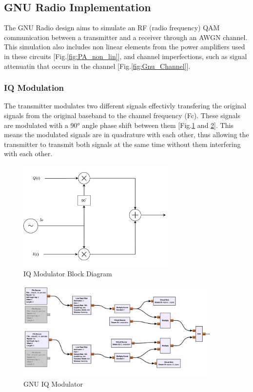 \subsection{GNU Radio Implementation}

The GNU Radio design aims to simulate an RF (radio frequency) QAM communication 
between a transmitter and a receiver through an AWGN channel.
This simulation also includes non linear elements from the power amplifiers used 
in these circuits [Fig.\ref{fig:PA_non_lin}], and channel imperfections, such 
as signal attenuatin that occurs in the channel [Fig.\ref{fig:Gnu_Channel}].

\subsubsection{IQ Modulation}

The transmitter modulates two different signals effectivly transfering the original signals 
from the original baseband to the channel frequency (Fc). These signals are modulated 
with a \ang{90} angle phase shift between them [Fig.\ref{fig:IQMod_Diagram} and \ref{fig:GNU_IQMod}].
This means the modulated signals are in quadrature with each other, thus allowing the 
transmitter to transmit both signals at the same time without them interfering with each 
other.

\begin{figure}[H]
    \centering
    \includegraphics*[width=0.7\textwidth]{Images/IQ_Mod_Diagram.png}
    \caption{IQ Modulator Block Diagram}
    \label{fig:IQMod_Diagram}
\end{figure}

\begin{figure}[H]
    \centering
    \includegraphics*[width=0.9\textwidth]{Images/GNU_Digital_IQMod.png}
    \caption{GNU IQ Modulator}
    \label{fig:GNU_IQMod}
\end{figure}

